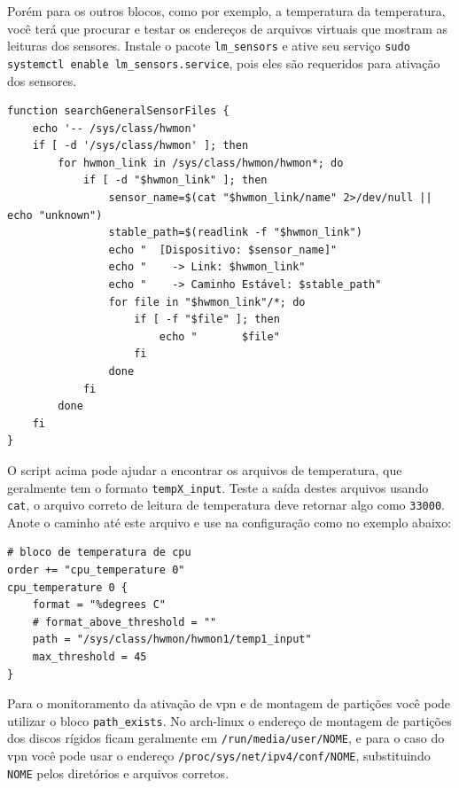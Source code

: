 \documentclass[12pt,a4paper]{article}
\begin{document}
\vspace{\baselineskip}

Porém para os outros blocos, como por exemplo, a temperatura da temperatura, você terá que procurar e testar os endereços de arquivos virtuais que mostram as leituras dos sensores. Instale o pacote \texttt{lm\_sensors} e ative seu serviço \texttt{sudo systemctl enable lm\_sensors.service}, pois eles são requeridos para ativação dos sensores.\\

\begin{lstlisting}
function searchGeneralSensorFiles {
    echo '-- /sys/class/hwmon'
    if [ -d '/sys/class/hwmon' ]; then
        for hwmon_link in /sys/class/hwmon/hwmon*; do
            if [ -d "$hwmon_link" ]; then
                sensor_name=$(cat "$hwmon_link/name" 2>/dev/null || echo "unknown")
                stable_path=$(readlink -f "$hwmon_link")
                echo "  [Dispositivo: $sensor_name]"
                echo "    -> Link: $hwmon_link"
                echo "    -> Caminho Estável: $stable_path"
                for file in "$hwmon_link"/*; do
                    if [ -f "$file" ]; then
                        echo "       $file"
                    fi
                done
            fi
        done
    fi
}    
\end{lstlisting}

\vspace{\baselineskip}

O script acima pode ajudar a encontrar os arquivos de temperatura, que geralmente tem o formato \texttt{tempX\_input}. Teste a saída destes arquivos usando \texttt{cat}, o arquivo correto de leitura de temperatura deve retornar algo como \texttt{33000}. Anote o caminho até este arquivo e use na configuração como no exemplo abaixo:\\

\begin{lstlisting}
# bloco de temperatura de cpu 
order += "cpu_temperature 0"
cpu_temperature 0 {
    format = "%degrees C"
    # format_above_threshold = ""
    path = "/sys/class/hwmon/hwmon1/temp1_input"
    max_threshold = 45
}
\end{lstlisting}

\vspace{\baselineskip}

Para o monitoramento da ativação de vpn e de montagem de partições você pode utilizar o bloco \texttt{path\_exists}. No arch-linux o endereço de montagem de partições dos discos rígidos ficam geralmente em \texttt{/run/media/user/NOME}, e para o caso do vpn você pode usar o endereço \texttt{/proc/sys/net/ipv4/conf/NOME}, substituindo \texttt{NOME} pelos diretórios e arquivos corretos. \\
\end{document}
